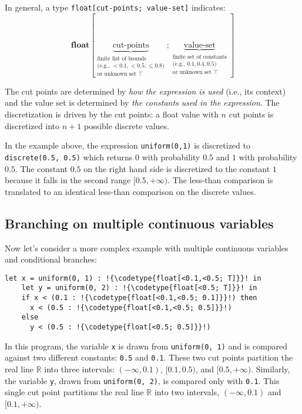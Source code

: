 \documentclass[acmsmall,screen,dvipsnames,x11names,nonacm,anonymous,review]{acmart}
\newcommand{\codetype}[1]{\textcolor{typecolor}{\ttfamily\small#1}}
\newcommand{\R}{\mathbb{R}}
\begin{document}
In general, a type \lstinline{float[cut-points; value-set]} indicates:
\[
\textbf{float}
[
\underbrace{\text{cut-points}}_{\begin{array}{c}\text{finite list of bounds}\\\text{(e.g., }<\!0.1, <\!0.5, \leq\!0.8\text{)}\\\text{or unknown set }\top\end{array}}
;
\underbrace{\text{value-set}}_{\begin{array}{c}\text{finite set of constants}\\\text{(e.g., }0.1, 0.4, 0.5\text{)}\\\text{or unknown set }\top\end{array}}
]
\]

The cut points are determined by \emph{how the expression is used} (i.e., its context) and the value set is determined by \emph{the constants used in the expression}.
The discretization is driven by the cut points: a float value with $n$ cut points is discretized into $n+1$ possible discrete values.

In the example above, the expression \lstinline{uniform(0,1)} is discretized to \lstinline{discrete(0.5, 0.5)} which returns $0$ with probability $0.5$ and $1$ with probability $0.5$.
The constant $0.5$ on the right hand side is discretized to the constant $1$ because it falls in the second range $[0.5, +\infty)$. The less-than comparison is translated to an identical less-than comparison on the discrete values.

\subsection{Branching on multiple continuous variables}

\noindent Now let's consider a more complex example with multiple continuous variables and conditional branches:

\begin{lstlisting}[aboveskip=1em,belowskip=1em,escapechar=!]
    let x = uniform(0, 1) : !{\codetype{float[<0.1,<0.5; T]}}! in
    let y = uniform(0, 2) : !{\codetype{float[<0.5; T]}}! in
    if x < (0.1 : !{\codetype{float[<0.1,<0.5; 0.1]}}!) then
      x < (0.5 : !{\codetype{float[<0.1,<0.5; 0.5]}}!)
    else
      y < (0.5 : !{\codetype{float[<0.5; 0.5]}}!)
\end{lstlisting}

\noindent In this program, the variable \texttt{x} is drawn from \texttt{uniform(0, 1)} and is compared against two different constants: \texttt{0.5} and \texttt{0.1}. These two cut points partition the real line $\R$ into three intervals: $(-\infty, 0.1)$, $[0.1, 0.5)$, and $[0.5, +\infty)$. Similarly, the variable \texttt{y}, drawn from \texttt{uniform(0, 2)}, is compared only with \texttt{0.1}. This single cut point partitions the real line $\R$ into two intervals, $(-\infty, 0.1)$ and $[0.1, +\infty)$.
\end{document}
